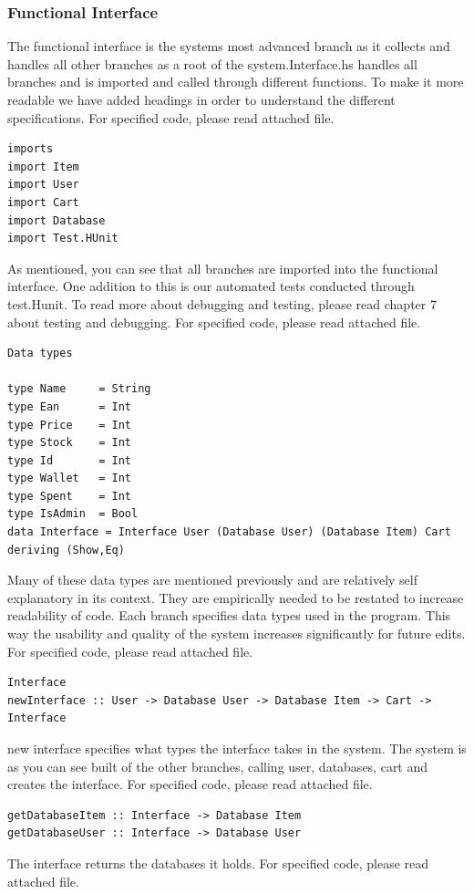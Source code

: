\documentclass[11pt]{article}
\begin{document}
\subsubsection{Functional Interface}
The functional interface is the systems most advanced branch as it collects and handles all other branches as a root of the system.Interface.hs handles all branches and is imported and called through different functions. To make it more readable we have added headings in order to understand the different specifications. For specified code, please read attached file.
\begin{lstlisting}
imports
import Item
import User
import Cart
import Database
import Test.HUnit
\end{lstlisting}
As mentioned, you can see that all branches are imported into the functional interface. One addition to this is our automated tests conducted through test.Hunit.
To read more about debugging and testing, please read chapter 7 about testing and debugging. For specified code, please read attached file.
\begin{lstlisting}
Data types

type Name     = String
type Ean      = Int
type Price    = Int
type Stock    = Int
type Id       = Int
type Wallet   = Int
type Spent    = Int
type IsAdmin  = Bool
data Interface = Interface User (Database User) (Database Item) Cart deriving (Show,Eq)
\end{lstlisting}
Many of these data types are mentioned previously and are relatively self explanatory in its context. They are empirically needed to be restated to increase readability of code. Each branch specifies data types used in the program. This way the usability and quality of the system increases significantly for future edits. For specified code, please read attached file.\\
\begin{lstlisting}
Interface
newInterface :: User -> Database User -> Database Item -> Cart -> Interface
\end{lstlisting}
new interface specifies what types the interface takes in the system. The system is as you can see built of the other branches, calling user, databases, cart and creates the interface. For specified code, please read attached file.
\begin{lstlisting}
getDatabaseItem :: Interface -> Database Item
getDatabaseUser :: Interface -> Database User
\end{lstlisting}
The interface returns the databases it holds. For specified code, please read attached file.
\end{document}
